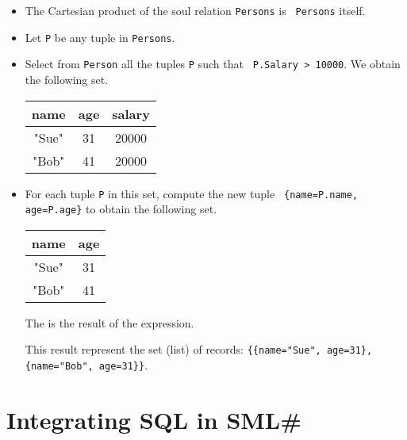\documentclass{jbook}
\newcommand{\txt}[2]{#2}
\newcommand{\smlsharp}{SML\#}
\begin{document}
\begin{itemize}
\item The Cartesian product of the soul relation {\tt Persons} is {\tt
Persons} itself.
\item Let {\tt P} be any tuple in {\tt Persons}.
\item Select from {\tt Person} all the tuples {\tt P} such that {\tt
P.Salary > 10000}.
	We obtain the following set.

\begin{center}
\begin{tabular}{|c|c|c|}
\hline
name & age & salary
\\\hline
"Sue" & 31 & 20000
\\\hline
"Bob" & 41 & 20000
\\\hline
\end{tabular}
\end{center}

\item For each tuple {\tt P} in this set, compute the new tuple {\tt
\{name=P.name, age=P.age\}} to obtain the following set.

\begin{center}
\begin{tabular}{|c|c|}
\hline
name & age
\\\hline
"Sue" & 31
\\\hline
"Bob" & 41
\\\hline
\end{tabular}
\end{center}
The is the result of the expression.
	
This result represent the set (list) of records:
{\tt \{\{name="Sue", age=31\}, \{name="Bob", age=31\}\}}.
\end{itemize}
\fi%

\section{\txt{\smlsharp{}へのSQL式の導入}{Integrating SQL in \smlsharp{}}}
\label{sec:tutorialIntoroducingSQL}
\end{document}

